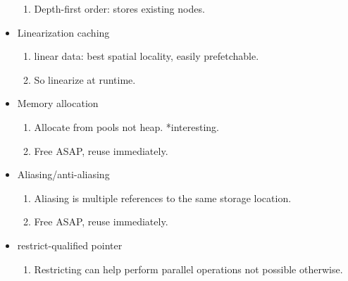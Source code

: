 \documentclass[a4paper]{article}
\begin{document}
\begin{itemize}
\begin{enumerate}
	\item Depth-first order: stores existing nodes.
   \end{enumerate}
   \item Linearization caching
   \begin{enumerate}
      \item linear data: best spatial locality, easily prefetchable.	
      \item So linearize at runtime.
   \end{enumerate}
   \item Memory allocation
   \begin{enumerate}
      \item Allocate from pools not heap. *interesting.
      \item Free ASAP, reuse immediately.
   \end{enumerate}
   \item Aliasing/anti-aliasing
   \begin{enumerate}
      \item Aliasing is multiple references to the same storage location.
      \item Free ASAP, reuse immediately.
      \end{enumerate}
      \item restrict-qualified pointer
      \begin{enumerate}
	 \item Restricting can help perform parallel operations not possible otherwise.
      \end{enumerate}

\end{itemize}
\end{document}

